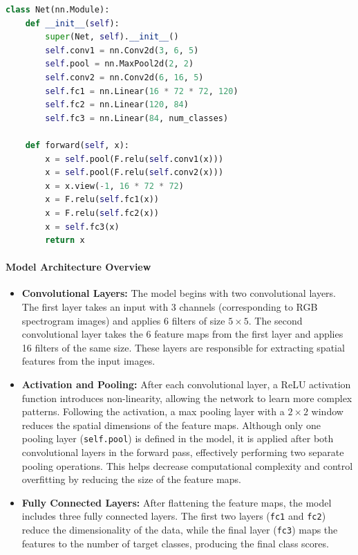 \documentclass[12pt]{article}
\begin{document}
\begin{lstlisting}[language=Python, caption=CNN Model Architecture]
class Net(nn.Module):
    def __init__(self):
        super(Net, self).__init__()
        self.conv1 = nn.Conv2d(3, 6, 5)
        self.pool = nn.MaxPool2d(2, 2)
        self.conv2 = nn.Conv2d(6, 16, 5)
        self.fc1 = nn.Linear(16 * 72 * 72, 120)
        self.fc2 = nn.Linear(120, 84)
        self.fc3 = nn.Linear(84, num_classes)

    def forward(self, x):
        x = self.pool(F.relu(self.conv1(x)))
        x = self.pool(F.relu(self.conv2(x)))
        x = x.view(-1, 16 * 72 * 72)
        x = F.relu(self.fc1(x))
        x = F.relu(self.fc2(x))
        x = self.fc3(x)
        return x
\end{lstlisting}

\paragraph{Model Architecture Overview}

\begin{itemize}
    \item \textbf{Convolutional Layers:} The model begins with two convolutional layers. The first layer takes an input with 3 channels (corresponding to RGB spectrogram images) and applies 6 filters of size \(5 \times 5\). The second convolutional layer takes the 6 feature maps from the first layer and applies 16 filters of the same size. These layers are responsible for extracting spatial features from the input images.
    
    \item \textbf{Activation and Pooling:} After each convolutional layer, a ReLU activation function introduces non-linearity, allowing the network to learn more complex patterns. Following the activation, a max pooling layer with a \(2 \times 2\) window reduces the spatial dimensions of the feature maps. Although only one pooling layer (\texttt{self.pool}) is defined in the model, it is applied after both convolutional layers in the forward pass, effectively performing two separate pooling operations. This helps decrease computational complexity and control overfitting by reducing the size of the feature maps.
    
    \item \textbf{Fully Connected Layers:} After flattening the feature maps, the model includes three fully connected layers. The first two layers (\texttt{fc1} and \texttt{fc2}) reduce the dimensionality of the data, while the final layer (\texttt{fc3}) maps the features to the number of target classes, producing the final class scores.
\end{itemize}
\end{document}
